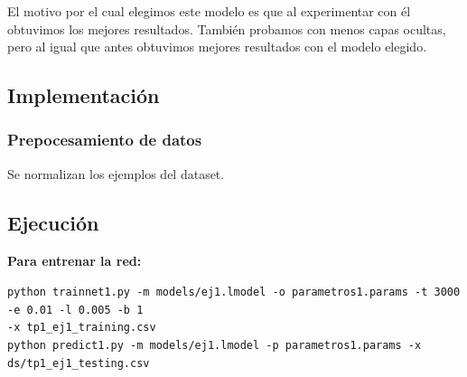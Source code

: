 El motivo por el cual elegimos este modelo es que al experimentar con él obtuvimos los mejores resultados. También probamos con menos capas ocultas, pero al igual que antes 
obtuvimos mejores resultados con el modelo elegido.


\subsection{Implementación}


\subsubsection{Prepocesamiento de datos}

Se normalizan los ejemplos del dataset.




\subsection{Ejecución}

\textbf{Para entrenar la red:}

\noindent\texttt{\scriptsize{python trainnet1.py -m models/ej1.lmodel -o parametros1.params -t 3000 -e 0.01 -l 0.005 -b 1}} \\

\texttt{\scriptsize{-x tp1\_ej1\_training.csv}} \\

\noindent\texttt{\scriptsize{python predict1.py -m models/ej1.lmodel -p parametros1.params -x ds/tp1\_ej1\_testing.csv}} \\

